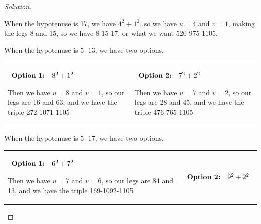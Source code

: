 \documentclass[11pt]{article}
\newenvironment{solution}
  {\renewcommand\qedsymbol{$~$}\begin{proof}[Solution]$ $\par\nobreak\ignorespaces}
  {\end{proof}}
\begin{document}
\begin{solution}
  When the hypotenuse is 17, we have $4^2+1^2$, so we have $u=4$ and $v=1$, making the legs 8 and 15, so we have 8-15-17, or what we want 520-975-1105.

  When the hypotenuse is $5\cdot 13$, we have two options,
  \begin{center}
    \begin{NiceTabular}[width=0.95\textwidth]{X[l] !{\qquad} X[l]}
      \begin{math}
        \begin{array}[t]{rl}
          \textbf{Option 1:} & 8^2+1^2 \\
        \end{array}
      \end{math}

      Then we have $u=8$ and $v=1$, so our legs are 16 and 63, and we have the triple 272-1071-1105


       &
      \begin{math}
        \begin{array}[t]{rl}
          \textbf{Option 2:} & 7^2+2^2
        \end{array}
      \end{math}

      Then we have $u=7$ and $v=2$, so our legs are 28 and 45, and we have the triple 476-765-1105
      \\
    \end{NiceTabular}
  \end{center}

  When the hypotenuse is $5\cdot 17$, we have two options,
  \begin{center}
    \begin{NiceTabular}[width=0.95\textwidth]{X[l] !{\qquad} X[l]}
      \begin{math}
        \begin{array}[t]{rl}
          \textbf{Option 1:} & 6^2+7^2 \\
        \end{array}
      \end{math}

      Then we have $u=7$ and $v=6$, so our legs are 84 and 13, and we have the triple 169-1092-1105


       &
      \begin{math}
        \begin{array}[t]{rl}
          \textbf{Option 2:} & 9^2+2^2
        \end{array}
      \end{math}


\end{NiceTabular}
\end{center}
\end{solution}
\end{document}
